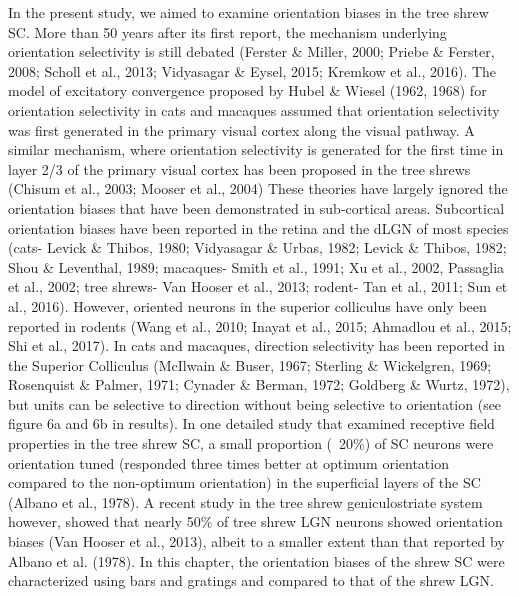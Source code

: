 In the present study, we aimed to examine orientation biases in the tree shrew SC. More than 50 years after its first report, the mechanism underlying orientation selectivity is still debated (Ferster \& Miller, 2000; Priebe \& Ferster, 2008; Scholl et al., 2013; Vidyasagar \& Eysel, 2015; Kremkow et al., 2016). The model of excitatory convergence proposed by Hubel \& Wiesel (1962, 1968) for orientation selectivity in cats and macaques assumed that orientation selectivity was first generated in the primary visual cortex along the visual pathway. A similar mechanism, where orientation selectivity is generated for the first time in layer 2/3 of the primary visual cortex has been proposed in the tree shrews (Chisum et al., 2003; Mooser et al., 2004) These theories have largely ignored the orientation biases that have been demonstrated in sub-cortical areas. Subcortical orientation biases have been reported in the retina and the dLGN of most species (cats- Levick \& Thibos, 1980; Vidyasagar \& Urbas, 1982; Levick \& Thibos, 1982; Shou \& Leventhal, 1989; macaques- Smith et al., 1991; Xu et al., 2002, Passaglia et al., 2002; tree shrews- Van Hooser et al., 2013; rodent- Tan et al., 2011; Sun et al., 2016). However, oriented neurons in the superior colliculus have only been reported in rodents (Wang et al., 2010; Inayat et al., 2015; Ahmadlou et al., 2015; Shi et al., 2017). In cats and macaques, direction selectivity has been reported in the Superior Colliculus (McIlwain \& Buser, 1967; Sterling \& Wickelgren, 1969; Rosenquist \& Palmer, 1971; Cynader \& Berman, 1972; Goldberg \& Wurtz, 1972), but units can be selective to direction without being selective to orientation (see figure 6a and 6b in results). In one detailed study that examined receptive field properties in the tree shrew SC, a small proportion (~20\%) of SC neurons were orientation tuned (responded three times better at optimum orientation compared to the non-optimum orientation) in the superficial layers of the SC (Albano et al., 1978). A recent study in the tree shrew geniculostriate system however, showed that nearly 50\% of tree shrew LGN neurons showed orientation biases (Van Hooser et al., 2013), albeit to a smaller extent than that reported by Albano et al. (1978). In this chapter, the orientation biases of the shrew SC were characterized using bars and gratings and compared to that of the shrew LGN.

